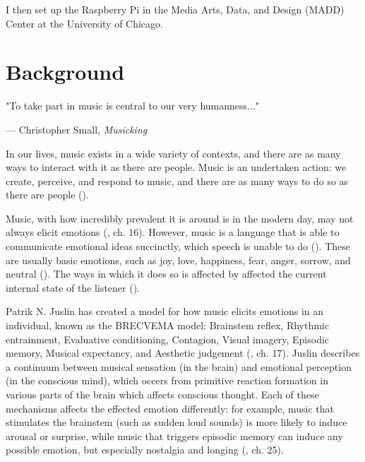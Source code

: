 \documentclass{article}
\renewcommand{\_}[1]{\underline{ #1 }}
\theoremstyle{definition}
\begin{document}
I then set up the Raspberry Pi in the Media Arts, Data, and Design (MADD) Center at the University of Chicago. 


\section{Background}

\begin{flushright}
    "To take part in music is central to our very humanness..."

    --- Christopher Small, \textit{Musicking}
\end{flushright}

In our lives, music exists in a wide variety of contexts, and there are as many ways to interact with it as there are people. Music is an undertaken action: we create, perceive, and respond to music, and there are as many ways to do so as there are people (\cite{small1998}). 

Music, with how incredibly prevalent it is around is in the modern day, may not always elicit emotions (\cite{juslin2019}, ch. 16). However, music is a language that is able to communicate emotional ideas succinctly, which speech is unable to do (\cite{henson1977}). These are usually basic emotions, such as joy, love, happiness, fear, anger, sorrow, and neutral (\cite{sundberg1983}). The ways in which it does so is affected by affected the current internal state of the listener (\cite{harrer1977}). 

Patrik N. Juslin has created a model for how music elicits emotions in an individual, known as the BRECVEMA model: Brainstem reflex, Rhythmic entrainment, Evaluative conditioning, Contagion, Visual imagery, Episodic memory, Musical expectancy, and Aesthetic judgement (\cite{juslin2019}, ch. 17). Juslin describes a continuum between musical sensation (in the brain) and emotional perception (in the conscious mind), which occers from primitive reaction formation in various parts of the brain which affects conscious thought. Each of these mechanisms affects the effected emotion differently: for example, music that stimulates the brainstem (such as sudden loud sounds) is more likely to induce arousal or surprise, while music that triggers episodic memory can induce any possible emotion, but especially nostalgia and longing (\cite{juslin2019}, ch. 25).
\end{document}
